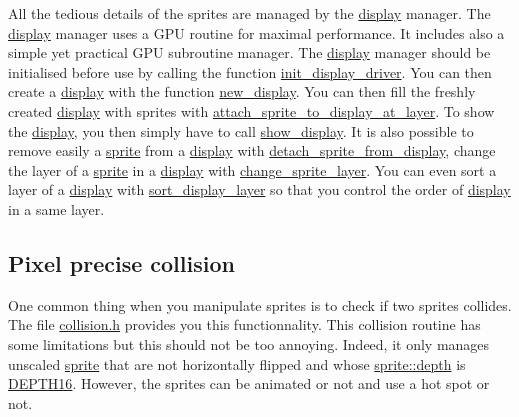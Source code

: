 All the tedious details of the sprites are managed by the \hyperlink{structdisplay}{display} manager. The \hyperlink{structdisplay}{display} manager uses a GPU routine for maximal performance. It includes also a simple yet practical GPU subroutine manager. The \hyperlink{structdisplay}{display} manager should be initialised before use by calling the function \hyperlink{display_8h_c1d421d8231a87be44954076badad7ad}{init\_\-display\_\-driver}. You can then create a \hyperlink{structdisplay}{display} with the function \hyperlink{sprite_8h_d35507fe3be38968539712d2e743d79e}{new\_\-display}. You can then fill the freshly created \hyperlink{structdisplay}{display} with sprites with \hyperlink{sprite_8h_8439f1930459d5613bc2576ebaddc058}{attach\_\-sprite\_\-to\_\-display\_\-at\_\-layer}. To show the \hyperlink{structdisplay}{display}, you then simply have to call \hyperlink{display_8h_477e81f40f0d2b23cb1c0a2d7882fba5}{show\_\-display}. It is also possible to remove easily a \hyperlink{structsprite}{sprite} from a \hyperlink{structdisplay}{display} with \hyperlink{sprite_8h_318f6dac0cf3be3157548d09badda13e}{detach\_\-sprite\_\-from\_\-display}, change the layer of a \hyperlink{structsprite}{sprite} in a \hyperlink{structdisplay}{display} with \hyperlink{sprite_8h_970107ca72a467e46e448fbb1462514d}{change\_\-sprite\_\-layer}. You can even sort a layer of a \hyperlink{structdisplay}{display} with \hyperlink{sprite_8h_dee6bffa6fb009e08ce22e260271ddee}{sort\_\-display\_\-layer} so that you control the order of \hyperlink{structdisplay}{display} in a same layer.\hypertarget{index_coll_subsec}{}\subsection{Pixel precise collision}\label{index_coll_subsec}
One common thing when you manipulate sprites is to check if two sprites collides. The file \hyperlink{collision_8h}{collision.h} provides you this functionnality. This collision routine has some limitations but this should not be too annoying. Indeed, it only manages unscaled \hyperlink{structsprite}{sprite} that are not horizontally flipped and whose \hyperlink{structsprite_95000d86cccbadcd1222da63b9a0aa75}{sprite::depth} is \hyperlink{op_8h_40fbe8949b277afd0fac64228851b12a01b2376a263afddba89e359530acd8d2}{DEPTH16}. However, the sprites can be animated or not and use a hot spot or not.

